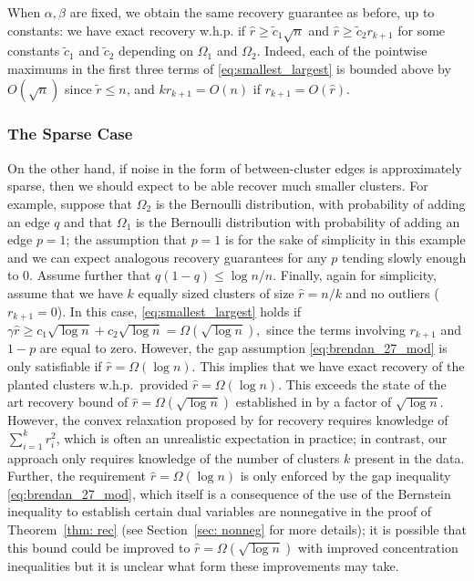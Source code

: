 \documentclass[twoside,11pt]{article}
\newcommand{\0}{\bs{0}}
\newcommand{\ra}{\rightarrow}
\begin{document}
{When \( \alpha, \beta \) are fixed, we obtain the same recovery guarantee as before, up to constants:
 we have exact recovery w.h.p.
if \(\hat r \ge \tilde c_1 \sqrt{n} \) and \(\hat r \ge \tilde c_2 r_{k+1} \)
for some constants \(\tilde c_1\) and \(\tilde c_2\) depending on \(\Omega_1\) and \(\Omega_2\).
Indeed, each of the pointwise maximums in the first  three terms 
of \eqref{eq:smallest_largest} is bounded above by $O(\sqrt{n})$
since $\tilde r \le n$, and $k r_{k+1} = O(n)$ if $r_{k+1} = O(\hat r)$.

\subsubsection{The Sparse Case}


On the other hand, if noise in the form of between-cluster 
edges is  approximately sparse, then we
should expect to be able recover
much smaller clusters.
For example, suppose that \(\Omega_2\) is the Bernoulli distribution, with probability of adding an edge \(q\) and that \(\Omega_1\) is the Bernoulli distribution with probability of adding an edge \(p=1\); the assumption that \(p=1\) is for the sake of simplicity in this example and we can expect analogous recovery guarantees for 
any \(p\) tending slowly enough to \(0\).
Assume further that 
\(
q (1-q)  \le {\log n }/{n}.
\)
Finally, again for simplicity, assume that we have \(k\) equally sized clusters of size \(\hat r = n/k\)
and no outliers (\(r_{k+1} = 0\)).
In this case, \eqref{eq:smallest_largest}
holds if
$
\gamma \hat r \ge c_1 \sqrt{\log n} + c_2 \sqrt{\log n}
= \Omega(\sqrt{\log n} ),
$
since the terms involving \(r_{k+1}\) and \(1-p\) are equal to zero.
However, the gap assumption \eqref{eq:brendan_27_mod} is only 
satisfiable if $\hat r = \Omega(\log n)$.
This implies that we have exact recovery of the planted clusters
w.h.p.~provided $\hat r =\Omega(\log n)$. This exceeds the 
state of the art recovery bound
of $\hat r = \Omega(\sqrt{\log n})$ established in \cite{jalali2015relative}
by a factor of $\sqrt{\log n}$.
However, the convex relaxation proposed by
\cite{jalali2015relative} for recovery requires knowledge
of $\sum_{i=1}^k r_i^2$, which is often an unrealistic
expectation in practice;
in contrast, our approach only requires knowledge
of the number of clusters $k$ present in the data.
Further,  the requirement $\hat r = \Omega(\log n)$
is only enforced by the gap inequality \eqref{eq:brendan_27_mod}, 
which itself is a consequence of the use of the Bernstein inequality
to establish certain dual variables are nonnegative
in the proof of Theorem~\ref{thm: rec} (see Section~\ref{sec: nonneg}
for more details); it is possible that this bound could be improved
to $\hat r = \Omega(\sqrt{\log n})$ with improved concentration
inequalities 
 but it is unclear
what form these improvements may take.


}
\end{document}
